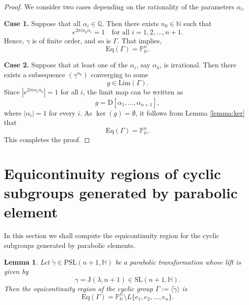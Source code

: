 \documentclass[12pt,reqno]{amsart}
\numberwithin{equation}{section}
\newtheorem{lemma}[theorem]{Lemma}
\theoremstyle{definition}
\def\H{\mathbb H}
\def\P{\mathbb P}
\def\H{\mathbb {H}}
\begin{document}
\begin{proof}
We consider two cases depending on the rationality of the parameters $\alpha_i$.

\smallskip
\noindent
\textbf{Case 1.} Suppose that all $\alpha_i \in \mathbb{Q}$. Then there exists $n_0 \in \mathbb{N}$ such that 
\[
e^{2\pi i n_0 \alpha_i} = 1 \quad \text{for all } i = 1, 2, \ldots, n+1.
\]
Hence, $\gamma$ is of finite order, and so is $\Gamma$. That implies,
\[
\mathrm{Eq}(\Gamma) = \mathbb{P}^n_{\mathbb{H}}.
\]

\smallskip
\noindent
\textbf{Case 2.} Suppose that at least one of the $\alpha_i$, say $\alpha_k$, is irrational. Then there exists a subsequence $(\gamma^{n_k})$ converging to some 
\[
g \in \mathrm{Lim}(\Gamma).
\]
Since $|e^{2\pi i \alpha_i n_k}| = 1$ for all $i$, the limit map can be written as 
\[
g = \mathrm{D}[\alpha_1, \ldots, \alpha_{n+1}],
\]
where $|\alpha_i| = 1$ for every $i$. As $\ker(g) = \emptyset$, it follows from Lemma \ref{lemma:ker} that
\[
\mathrm{Eq}(\Gamma) = \mathbb{P}^n_{\mathbb{H}}.
\]
This completes the proof.
\end{proof}


\section{Equicontinuity regions of cyclic subgroups generated by parabolic element}\label{sec:parabolic}
In this section we shall compute the equicontinuity region for the cyclic subgroups generated by parabolic elements.

\begin{lemma}
\label{th:par1}
Let $\tilde{\gamma} \in \mathrm{PSL}(n+1, \mathbb{H})$ be a parabolic transformation whose lift is given by 
\[
\gamma = \mathrm{J}(\lambda, n+1) \in \mathrm{SL}(n+1, \mathbb{H}).
\]
Then the equicontinuity region of the cyclic group $\Gamma := \langle \tilde{\gamma} \rangle$ is 
\[
\mathrm{Eq}(\Gamma) = \P^n_\H\setminus L\{ e_1, e_2, \ldots, e_n \}.
\]
\end{lemma}
\end{document}
